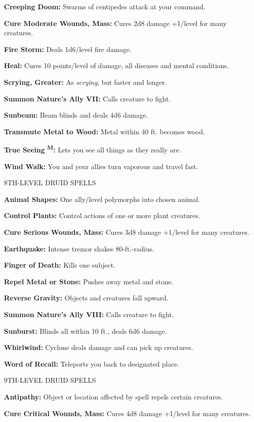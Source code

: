 \documentclass{article}
\begin{document}
\textbf{Creeping Doom:} Swarms of centipedes attack at your command.

\textbf{Cure Moderate Wounds, Mass:} Cures 2d8 damage +1/level for many creatures.

\textbf{Fire Storm:} Deals 1d6/level fire damage.

\textbf{Heal:} Cures 10 points/level of damage, all diseases and mental conditions.

\textbf{Scrying, Greater:} As \textit{scrying}, but faster and longer.

\textbf{Summon Nature's Ally VII:} Calls creature to fight.

\textbf{Sunbeam:} Beam blinds and deals 4d6 damage.

\textbf{Transmute Metal to Wood: }Metal within 40 ft. becomes wood.

\textbf{True Seeing }\textsuperscript{\textbf{M}}\textbf{:} Lets you see all things 
as they really are.

\textbf{Wind Walk:} You and your allies turn vaporous and travel fast.

8TH-LEVEL DRUID SPELLS

\textbf{Animal Shapes:} One ally/level polymorphs into chosen animal.

\textbf{Control Plants:} Control actions of one or more plant creatures.

\textbf{Cure Serious Wounds, Mass:} Cures 3d8 damage +1/level for many creatures.

\textbf{Earthquake:} Intense tremor shakes 80-ft.-radius.

\textbf{Finger of Death:} Kills one subject.

\textbf{Repel Metal or Stone:} Pushes away metal and stone.

\textbf{Reverse Gravity:} Objects and creatures fall upward.

\textbf{Summon Nature's Ally VIII:} Calls creature to fight.

\textbf{Sunburst:} Blinds all within 10 ft., deals 6d6 damage.

\textbf{Whirlwind:} Cyclone deals damage and can pick up creatures.

\textbf{Word of Recall:} Teleports you back to designated place.

9TH-LEVEL DRUID SPELLS

\textbf{Antipathy:} Object or location affected by spell repels certain creatures.

\textbf{Cure Critical Wounds, Mass:} Cures 4d8 damage +1/level for many creatures.
\end{document}
